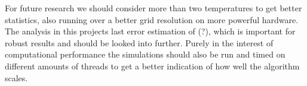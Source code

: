\documentclass[twocolumn]{aastex62}
\begin{document}
For future research we should consider more than two temperatures
to get better statistics, also running over a better grid
resolution on more powerful hardware. The analysis in this projects last error
estimation of (?), which is important for robust results and should be looked
into further. 
Purely in the interest of computational performance the
simulations should also be run and timed on different amounts of threads
to get a better indication of how well the algorithm scales.


\newpage


\end{document}
